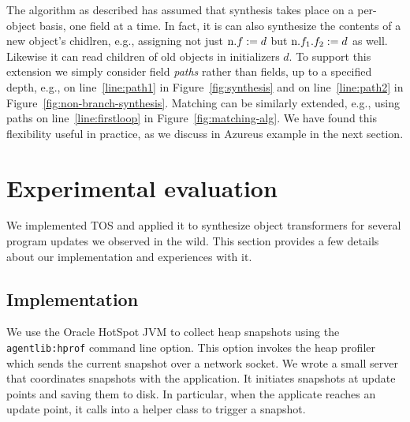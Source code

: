 \documentclass[natbib]{sigplanconf}
\newcommand{\TOS}{TOS\xspace}
\begin{document}
The algorithm as described has
assumed that synthesis takes place on a per-object basis, one field at
a time.  In fact, it is can also synthesize the contents of a new object's
chidlren, e.g., assigning not just $\textrm{n}.f := d$ but $\textrm{n}.f_1.f_2
:= d$ as well.  Likewise it can read children of old objects in
initializers $d$.  To support this extension we simply consider field \emph{paths}
rather than fields, up to a specified depth, e.g., on
line~\ref{line:path1} in Figure~\ref{fig:synthesis} 
and on line~\ref{line:path2} in Figure~\ref{fig:non-branch-synthesis}.
Matching can be similarly extended, e.g., using paths on 
line~\ref{line:firstloop} in Figure~\ref{fig:matching-alg}.  We have found this
flexibility useful in practice, as we discuss in Azureus example in the next
section.

\section{Experimental evaluation}

We implemented \TOS and applied it to synthesize object
transformers for several program updates we observed in the wild.  
This section provides a few details about our implementation and
experiences with it.

\subsection{Implementation}

We use the Oracle HotSpot JVM to collect heap snapshots using the
\texttt{agentlib:hprof} command line option.  This option invokes the
heap profiler which sends the current snapshot over a
network socket.  We wrote a small server that coordinates snapshots
with the application. It initiates snapshots at update points and saving them
to disk.  In particular, when the applicate
reaches an update point, it calls into a helper class to trigger a
snapshot. %

\end{document}
